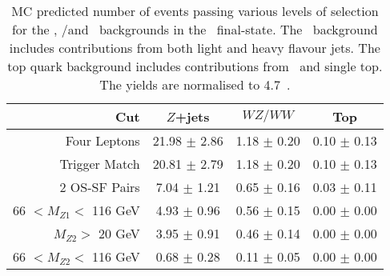 \begin{table}[htbp]
  \centering
  \begin{tabular}{r|c|c|c} 
    \hline\hline
                 Cut &               $Z$+jets &             $WZ/WW$ &               Top\\ 
    \hline
        Four Leptons &  21.98 $\pm$ 2.86 & 1.18 $\pm$ 0.20 & 0.10 $\pm$ 0.13 \\ 
       Trigger Match &  20.81 $\pm$ 2.79 & 1.18 $\pm$ 0.20 & 0.10 $\pm$ 0.13 \\ 
       2 OS-SF Pairs &  7.04 $\pm$ 1.21 & 0.65 $\pm$ 0.16 & 0.03 $\pm$ 0.11 \\ 
66 $ < M_{Z1} < $ 116 GeV &  4.93 $\pm$ 0.96 & 0.56 $\pm$ 0.15 & 0.00 $\pm$ 0.00 \\ 
  $M_{Z2} > $ 20 GeV &  3.95 $\pm$ 0.91 & 0.46 $\pm$ 0.14 & 0.00 $\pm$ 0.00 \\ 
66 $ < M_{Z2} < $ 116 GeV &  0.68 $\pm$ 0.28 & 0.11 $\pm$ 0.05 & 0.00 $\pm$ 0.00 \\ 
    \hline\hline
  \end{tabular}
  \caption[MC predicted number of events passing various levels of selection for
  the \Zjets, \WZ/\WW and \topquark\ backgrounds in the \eemm\ final-state.]
  {MC predicted number of events passing various levels of selection for
  the \Zjets, \WZ/\WW and \topquark\ backgrounds in the \eemm\ final-state. The
  \Zjets\ background includes contributions from both light and heavy flavour
  jets. The top quark background includes contributions from \ttbar\ and
  single top. The yields are normalised to 4.7~\ifb.
  }
  \label{table:mc-bg-2e2mu}
\end{table}


